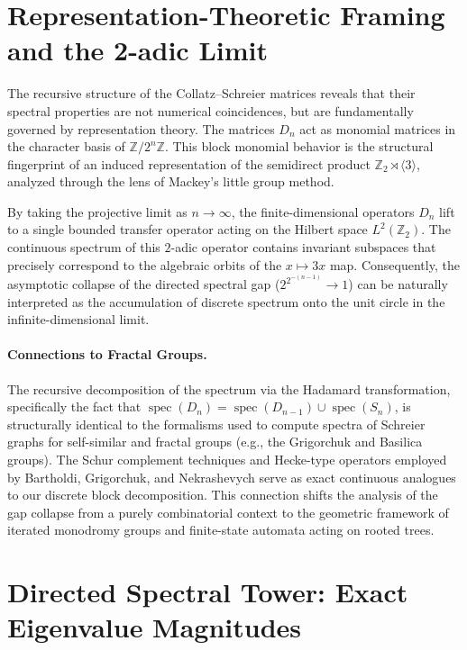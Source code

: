 \documentclass[12pt]{article}
\newcommand{\Z}{\mathbb{Z}}
\newcommand{\Zmod}[1]{\Z/2^{#1}\Z}
\newcommand{\spec}{\operatorname{spec}}
\begin{document}
\section{Representation-Theoretic Framing and the 2-adic Limit}
\label{sec:reptheory}

The recursive structure of the Collatz--Schreier matrices reveals that their spectral properties are not numerical coincidences, but are fundamentally governed by representation theory. The matrices $D_n$ act as monomial matrices in the character basis of $\Zmod{n}$. This block monomial behavior is the structural fingerprint of an induced representation of the semidirect product $\Z_2 \rtimes \langle 3 \rangle$, analyzed through the lens of Mackey's little group method.

By taking the projective limit as $n \to \infty$, the finite-dimensional operators $D_n$ lift to a single bounded transfer operator acting on the Hilbert space $L^2(\Z_2)$. The continuous spectrum of this $2$-adic operator contains invariant subspaces that precisely correspond to the algebraic orbits of the $x \mapsto 3x$ map. Consequently, the asymptotic collapse of the directed spectral gap ($2^{2^{-(n-1)}} \to 1$) can be naturally interpreted as the accumulation of discrete spectrum onto the unit circle in the infinite-dimensional limit.

\paragraph{Connections to Fractal Groups.} The recursive decomposition of the spectrum via the Hadamard transformation, specifically the fact that $\spec(D_n) = \spec(D_{n-1}) \cup \spec(S_n)$, is structurally identical to the formalisms used to compute spectra of Schreier graphs for self-similar and fractal groups (e.g., the Grigorchuk and Basilica groups). The Schur complement techniques and Hecke-type operators employed by Bartholdi, Grigorchuk, and Nekrashevych \cite{bartholdi2003, nekrashevych2005} serve as exact continuous analogues to our discrete block decomposition. This connection shifts the analysis of the gap collapse from a purely combinatorial context to the geometric framework of iterated monodromy groups and finite-state automata acting on rooted trees.

\section{Directed Spectral Tower: Exact Eigenvalue Magnitudes}
\label{sec:directed}
\end{document}
